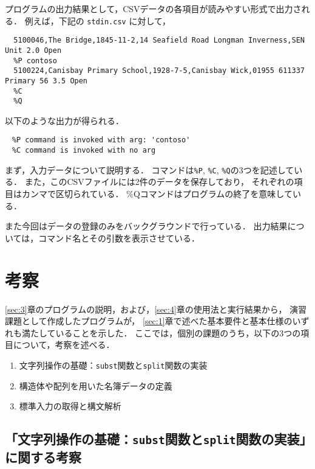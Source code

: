 \documentclass[autodetect-engine,dvi=dvipdfmx,ja=standard,
               a4j,11pt]{bxjsarticle}
\begin{document}
プログラムの出力結果として，CSVデータの各項目が読みやすい形式で出力される．
例えば，下記の \verb|stdin.csv| に対して，

{\fontsize{10pt}{11pt} \selectfont
 \begin{verbatim}
  5100046,The Bridge,1845-11-2,14 Seafield Road Longman Inverness,SEN Unit 2.0 Open
  %P contoso
  5100224,Canisbay Primary School,1928-7-5,Canisbay Wick,01955 611337 Primary 56 3.5 Open
  %C
  %Q
 \end{verbatim}
}

\noindent
以下のような出力が得られる．

{\fontsize{10pt}{11pt} \selectfont
 \begin{verbatim}
　%P command is invoked with arg: 'contoso'
　%C command is invoked with no arg
 \end{verbatim}
}

まず，入力データについて説明する．
コマンドは\verb|%P|, \verb|%C|, \verb|%Q|の3つを記述している．
また，このCSVファイルには2件のデータを保存しており，
それぞれの項目はカンマで区切られている．
\%Qコマンドはプログラムの終了を意味している．

また今回はデータの登録のみをバックグラウンドで行っている．
出力結果については，コマンド名とその引数を表示させている．


\section{考察} \label{sec:5}

\ref{sec:3}章のプログラムの説明，および，\ref{sec:4}章の使用法と実行結果から，
演習課題として作成したプログラムが，
\ref{sec:1}章で述べた基本要件と基本仕様のいずれも満たしていることを示した．
ここでは，個別の課題のうち，以下の3つの項目について，考察を述べる．

\begin{enumerate}
\setlength{\parskip}{2pt} \setlength{\itemsep}{2pt}
    \item 文字列操作の基礎：\texttt{subst}関数と\texttt{split}関数の実装
    \item 構造体や配列を用いた名簿データの定義
    \item 標準入力の取得と構文解析
\end{enumerate}

\subsection{「文字列操作の基礎：\texttt{subst}関数と\texttt{split}関数の実装」に関する考察}
\end{document}

